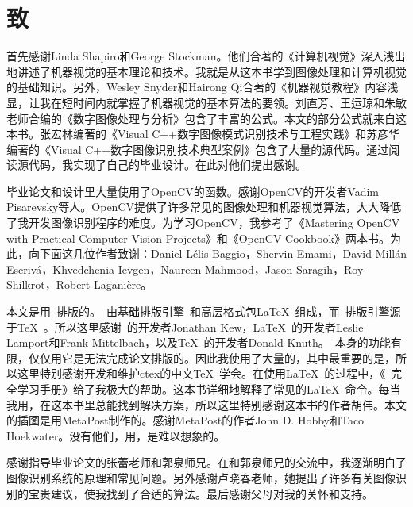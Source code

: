 
\chapter*{致}

首先感谢Linda Shapiro和George Stockman。他们合著的《计算机视觉》深入浅出地讲述了机器视觉的基本理论和技术。我就是从这本书学到图像处理和计算机视觉的基础知识。另外，Wesley Snyder和Hairong Qi合著的《机器视觉教程》内容浅显，让我在短时间内就掌握了机器视觉的基本算法的要领。刘直芳、王运琼和朱敏老师合编的《数字图像处理与分析》包含了丰富的公式。本文的部分公式就来自这本书。张宏林编著的《Visual C++数字图像模式识别技术与工程实践》和苏彦华编著的《Visual C++数字图像识别技术典型案例》包含了大量的源代码。通过阅读源代码，我实现了自己的毕业设计。在此对他们提出感谢。

毕业论文和设计里大量使用了OpenCV的函数。感谢OpenCV的开发者Vadim Pisarevsky等人。OpenCV提供了许多常见的图像处理和机器视觉算法，大大降低了我开发图像识别程序的难度。为学习OpenCV，我参考了《Mastering OpenCV with Practical Computer Vision Projects》和《OpenCV Cookbook》两本书。为此，向下面这几位作者致谢：Daniel Lélis Baggio，Shervin Emami，David Millán Escrivá，Khvedchenia Ievgen，Naureen Mahmood，Jason Saragih，Roy Shilkrot，Robert Laganière。

本文是用\XeLaTeX~排版的。\XeLaTeX~由基础排版引擎\XeTeX~和高层格式包\LaTeX~组成，而\XeTeX~排版引擎源于\TeX~。所以这里感谢\XeTeX~的开发者Jonathan Kew，\LaTeX~的开发者Leslie Lamport和Frank Mittelbach，以及\TeX~的开发者Donald Knuth。\XeLaTeX~本身的功能有限，仅仅用它是无法完成论文排版的。因此我使用了大量的，其中最重要的是，所以这里特别感谢开发和维护ctex的中文\TeX~学会。在使用\LaTeX~的过程中，《\LaTeXe~完全学习手册》给了我极大的帮助。这本书详细地解释了常见的\LaTeX~命令。每当我用，在这本书里总能找到解决方案，所以这里特别感谢这本书的作者胡伟。本文的插图是用MetaPost制作的。感谢MetaPost的作者John D. Hobby和Taco Hoekwater。没有他们，用，是难以想象的。

感谢指导毕业论文的张蕾老师和郭泉师兄。在和郭泉师兄的交流中，我逐渐明白了图像识别系统的原理和常见问题。另外感谢卢晓春老师，她提出了许多有关图像识别的宝贵建议，使我找到了合适的算法。最后感谢父母对我的关怀和支持。
